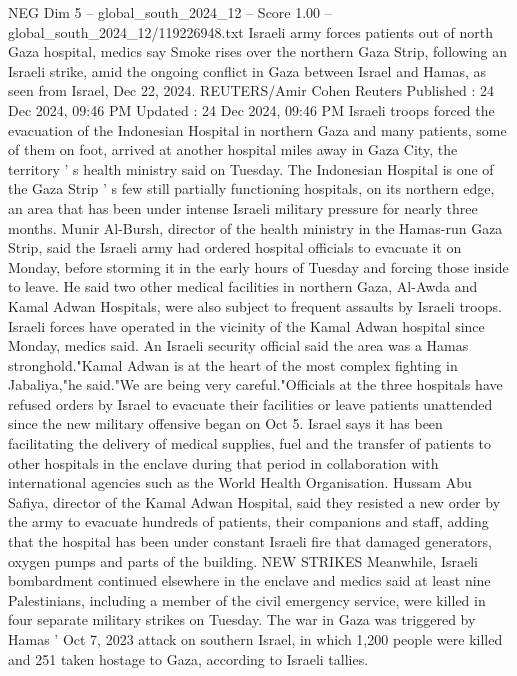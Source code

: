 \begin{textsample}{NEG Dim 5 – global\_south\_2024\_12 – Score 1.00 – global\_south\_2024\_12/119226948.txt}  \label{ex:f5_neg_409}
Israeli army forces patients out of north Gaza hospital, medics say Smoke rises over the northern Gaza Strip, following an Israeli strike, amid the ongoing conflict in Gaza between Israel and Hamas, as seen from Israel, Dec 22, 2024.
REUTERS/Amir Cohen Reuters Published : 24 Dec 2024, 09:46 PM Updated : 24 Dec 2024, 09:46 PM Israeli troops forced the evacuation of the Indonesian Hospital in northern Gaza and many patients, some of them on foot, arrived at another hospital miles away in Gaza City, the territory ' s health ministry said on Tuesday.
The Indonesian Hospital is one of the Gaza Strip ' s few still partially functioning hospitals, on its northern edge, an area that has been under intense Israeli military pressure for nearly three months.
Munir Al-Bursh, director of the health ministry in the Hamas-run Gaza Strip, said the Israeli army had ordered hospital officials to evacuate it on Monday, before storming it in the early hours of Tuesday and forcing those inside to leave.
He said two other medical facilities in northern Gaza, Al-Awda and Kamal Adwan Hospitals, were also subject to frequent assaults by Israeli troops.
Israeli forces have operated in the vicinity of the Kamal Adwan hospital since Monday, medics said.
An Israeli security official said the area was a Hamas stronghold."Kamal Adwan is at the heart of the most complex fighting in Jabaliya,"he said."We are being very careful."Officials at the three hospitals have refused orders by Israel to evacuate their facilities or leave patients unattended since the new military offensive began on Oct 5.
Israel says it has been facilitating the delivery of medical supplies, fuel and the transfer of patients to other hospitals in the enclave during that period in collaboration with international agencies such as the World Health Organisation.
Hussam Abu Safiya, director of the Kamal Adwan Hospital, said they resisted a new order by the army to evacuate hundreds of patients, their companions and staff, adding that the hospital has been under constant Israeli fire that damaged generators, oxygen pumps and parts of the building.
NEW STRIKES Meanwhile, Israeli bombardment continued elsewhere in the enclave and medics said at least nine Palestinians, including a member of the civil emergency service, were killed in four separate military strikes on Tuesday.
The war in Gaza was triggered by Hamas ' Oct 7, 2023 attack on southern Israel, in which 1,200 people were killed and 251 taken hostage to Gaza, according to Israeli tallies.

\end{textsample}
